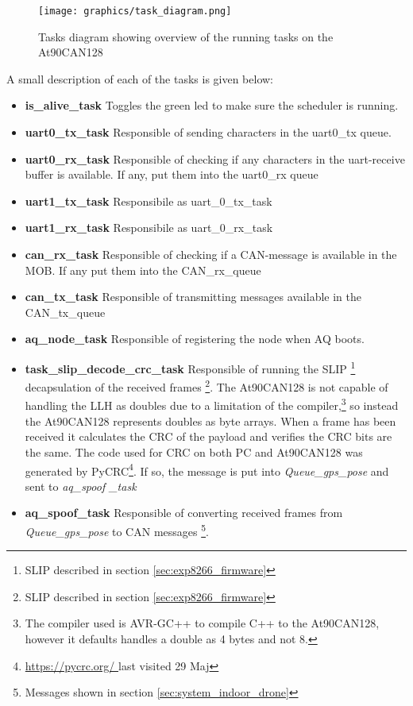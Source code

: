 \begin{figure}[H]
    \center
    \texttt{[image: graphics/task\_diagram.png]}
  \caption{Tasks diagram showing overview of the running tasks on the At90CAN128}
    \label{fig:task_diagram_atmega}
\end{figure}
A small description of each of the tasks is given below:
\begin{itemize}
\item \textbf{is\_alive\_task} Toggles the green led to make sure the scheduler is running.
\item \textbf{uart0\_tx\_task} Responsible of sending characters in the uart0\_tx queue.
\item \textbf{uart0\_rx\_task} Responsible of checking if any characters in the uart-receive buffer is available. If any, put them into the uart0\_rx queue
\item \textbf{uart1\_tx\_task} Responsibile as uart\_0\_tx\_task
\item \textbf{uart1\_rx\_task} Responsibile as uart\_0\_rx\_task
\item \textbf{can\_rx\_task} Responsible of checking if a CAN-message is available in the MOB. If any put them into the CAN\_rx\_queue
\item \textbf{can\_tx\_task} Responsible of transmitting messages available in the CAN\_tx\_queue
\item \textbf{aq\_node\_task} Responsible of registering the node when AQ boots.
\item \textbf{task\_slip\_decode\_crc\_task} Responsible of running the SLIP \footnote{SLIP described in section \ref{sec:exp8266_firmware}} decapsulation of the received frames \footnote{SLIP described in section \ref{sec:exp8266_firmware}}. The At90CAN128 is not capable of handling the \ac{LLH} as doubles due to a limitation of the compiler,\footnote{The compiler used is AVR-GC++ to compile C++ to the At90CAN128, however it defaults handles a double as 4 bytes and not 8.} so instead the At90CAN128 represents doubles as byte arrays.
When a frame has been received it calculates the CRC of the payload and verifies the CRC bits are the same. The code used for CRC on both PC and At90CAN128 was generated by PyCRC\footnote{\url{https://pycrc.org/ }last visited 29 Maj}.
If so, the message is put into \textit{Queue\_gps\_pose} and sent to \textit{aq\_spoof \_task}
\item \textbf{ aq\_spoof\_task} Responsible of converting  received frames from \textit{Queue\_gps\_pose} to CAN messages \footnote{Messages shown in section \ref{sec:system_indoor_drone}}.
\end{itemize}

